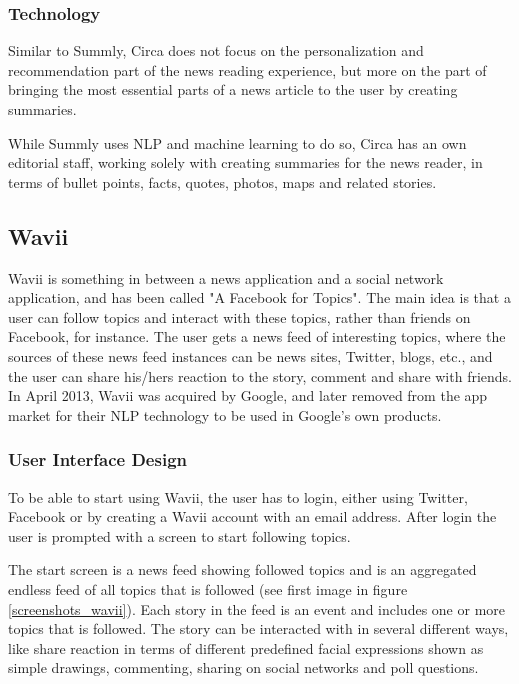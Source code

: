 \subsubsection{Technology}
Similar to Summly, Circa does not focus on the personalization and recommendation part of the news reading experience, but more on the part of bringing the most essential parts of a news article to the user by creating summaries.

While Summly uses NLP and machine learning to do so, Circa has an own editorial staff, working solely with creating summaries for the news reader, in terms of bullet points, facts, quotes, photos, maps and related stories\cite{circa_about}.

\subsection{Wavii}
Wavii is something in between a news application and a social network application, and has been called "A Facebook for Topics"\cite{wavii_facebook_for_topics}. The main idea is that a user can follow topics and interact with these topics, rather than friends on Facebook, for instance. The user gets a news feed of interesting topics, where the sources of these news feed instances can be news sites, Twitter, blogs, etc., and the user can share his/hers reaction to the story, comment and share with friends. In April 2013, Wavii was acquired by Google, and later removed from the app market for their NLP technology to be used in Google's own products\cite{google_acquired_wavii}.

\subsubsection{User Interface Design}
To be able to start using Wavii, the user has to login, either using Twitter, Facebook or by creating a Wavii account with an email address. After login the user is prompted with a screen to start following topics.

The start screen is a news feed showing followed topics and is an aggregated endless feed of all topics that is followed (see first image in figure \ref{screenshots_wavii}). Each story in the feed is an event and includes one or more topics that is followed. The story can be interacted with in several different ways, like share reaction in terms of different predefined facial expressions shown as simple drawings, commenting, sharing on social networks and poll questions.

